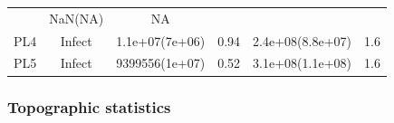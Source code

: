 \documentclass[]{article}
\begin{document}
\begin{longtable}[]{@{}cccccc@{}}
\begin{minipage}[t]{0.16\columnwidth}
\strut\end{minipage} &
\begin{minipage}[t]{0.17\columnwidth}\centering\strut
NaN(NA)
\strut\end{minipage} &
\begin{minipage}[t]{0.12\columnwidth}\centering\strut
NA
\strut\end{minipage}\tabularnewline
\begin{minipage}[t]{0.12\columnwidth}\centering\strut
PL4
\strut\end{minipage} &
\begin{minipage}[t]{0.12\columnwidth}\centering\strut
Infect
\strut\end{minipage} &
\begin{minipage}[t]{0.16\columnwidth}\centering\strut
1.1e+07(7e+06)
\strut\end{minipage} &
\begin{minipage}[t]{0.16\columnwidth}\centering\strut
0.94
\strut\end{minipage} &
\begin{minipage}[t]{0.17\columnwidth}\centering\strut
2.4e+08(8.8e+07)
\strut\end{minipage} &
\begin{minipage}[t]{0.12\columnwidth}\centering\strut
1.6
\strut\end{minipage}\tabularnewline
\begin{minipage}[t]{0.12\columnwidth}\centering\strut
PL5
\strut\end{minipage} &
\begin{minipage}[t]{0.12\columnwidth}\centering\strut
Infect
\strut\end{minipage} &
\begin{minipage}[t]{0.16\columnwidth}\centering\strut
9399556(1e+07)
\strut\end{minipage} &
\begin{minipage}[t]{0.16\columnwidth}\centering\strut
0.52
\strut\end{minipage} &
\begin{minipage}[t]{0.17\columnwidth}\centering\strut
3.1e+08(1.1e+08)
\strut\end{minipage} &
\begin{minipage}[t]{0.12\columnwidth}\centering\strut
1.6
\strut\end{minipage}\tabularnewline
\bottomrule
\end{longtable}

\newpage

\subsubsection{Topographic statistics}\label{topographic-statistics}
\end{document}
